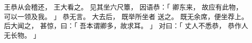 
\switchcolumn*[\section{}]

王恭从会稽还，
王大看之。
见其坐六尺簟，
因语恭：「
    卿东来，
    故应有此物，
    可以一领及我。
」
恭无言。
大去后，
既举所坐者
送之。
既无余席，便坐荐上。
后大闻之，
甚惊，曰：「
    吾本谓卿多，故求耳。
」
对曰：「
    丈人不悉恭，
    恭作人无长物。
」

\switchcolumn



